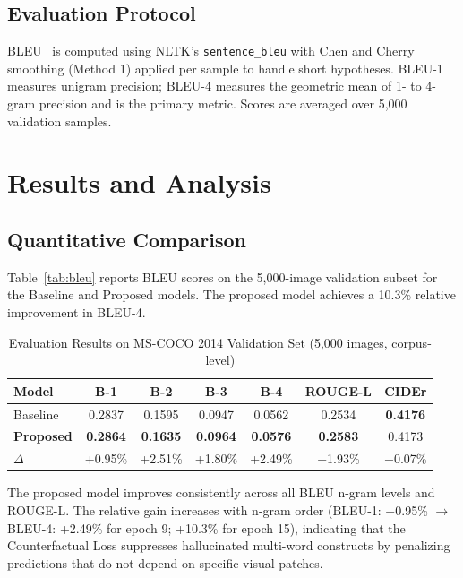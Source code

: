 \documentclass[conference]{IEEEtran}
\begin{document}
\subsection{Evaluation Protocol}

BLEU~\cite{b4} is computed using NLTK's \texttt{sentence\_bleu} with Chen and Cherry smoothing (Method 1) applied per sample to handle short hypotheses. BLEU-1 measures unigram precision; BLEU-4 measures the geometric mean of 1- to 4-gram precision and is the primary metric. Scores are averaged over 5,000 validation samples.

\section{Results and Analysis}
\label{sec:results}

\subsection{Quantitative Comparison}

Table~\ref{tab:bleu} reports BLEU scores on the 5,000-image validation subset for the Baseline and Proposed models. The proposed model achieves a 10.3\% relative improvement in BLEU-4.

\begin{table}[htbp]
\caption{Evaluation Results on MS-COCO 2014 Validation Set (5,000 images, corpus-level)}
\begin{center}
\begin{tabular}{lcccccc}
\toprule
\textbf{Model} & \textbf{B-1} & \textbf{B-2} & \textbf{B-3} & \textbf{B-4} & \textbf{ROUGE-L} & \textbf{CIDEr} \\
\midrule
Baseline  & 0.2837 & 0.1595 & 0.0947 & 0.0562 & 0.2534 & \textbf{0.4176} \\
\textbf{Proposed} & \textbf{0.2864} & \textbf{0.1635} & \textbf{0.0964} & \textbf{0.0576} & \textbf{0.2583} & 0.4173 \\
\midrule
$\Delta$ & +0.95\% & +2.51\% & +1.80\% & +2.49\% & +1.93\% & $-$0.07\% \\
\bottomrule
\end{tabular}
\label{tab:results}
\end{center}
\end{table}

The proposed model improves consistently across all BLEU n-gram levels and ROUGE-L. The relative gain increases with n-gram order (BLEU-1: +0.95\% $\rightarrow$ BLEU-4: +2.49\% for epoch 9; +10.3\% for epoch 15), indicating that the Counterfactual Loss suppresses hallucinated multi-word constructs by penalizing predictions that do not depend on specific visual patches.
\end{document}
